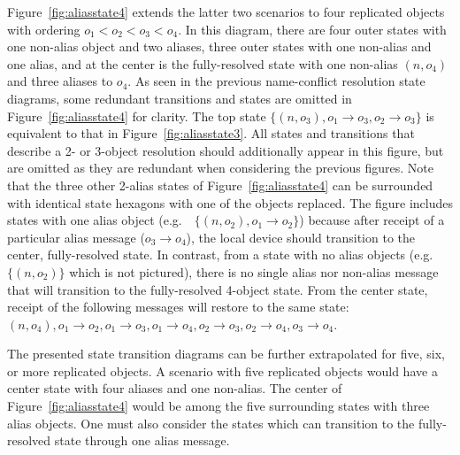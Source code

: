 Figure~\ref{fig:aliasstate4} extends the latter two scenarios to four replicated
objects with ordering $o_1 < o_2 < o_3 < o_4$. In this diagram, there are four
outer states with one non-alias object and two aliases, three outer states with
one non-alias and one alias, and at the center is the fully-resolved state with
one non-alias $(n,o_4)$ and three aliases to $o_4$.  As seen in the previous
name-conflict resolution state diagrams, some redundant transitions and states
are omitted in Figure~\ref{fig:aliasstate4} for clarity. The top state
$\{(n,o_3), o_1\rightarrow o_3, o_2 \rightarrow o_3\}$ is equivalent to that in
Figure~\ref{fig:aliasstate3}. All states and transitions that describe a 2- or
3-object resolution should additionally appear in this figure, but are omitted
as they are redundant when considering the previous figures. Note that the three
other 2-alias states of Figure~\ref{fig:aliasstate4} can be surrounded with
identical state hexagons with one of the objects replaced. The figure includes
states with one alias object (e.g.~\ $\{(n,o_2), o_1\rightarrow o_2\}$) because
after receipt of a particular alias message ($o_3 \rightarrow o_4$), the local
device should transition to the center, fully-resolved state. In contrast, from
a state with no alias objects (e.g.~\ $\{(n,o_2)\}$ which is not pictured),
there is no single alias nor non-alias message that will transition to the
fully-resolved 4-object state. From the center state, receipt of the following
messages will restore to the same state: $(n,o_4), o_1\rightarrow o_2, o_1
\rightarrow o_3, o_1 \rightarrow o_4, o_2\rightarrow o_3, o_2\rightarrow o_4,
o_3\rightarrow o_4$.

The presented state transition diagrams can be further extrapolated for five,
six, or more replicated objects. A scenario with five replicated objects would
have a center state with four aliases and one non-alias. The center of
Figure~\ref{fig:aliasstate4} would be among the five surrounding states with
three alias objects. One must also consider the states which can transition to
the fully-resolved state through one alias message.
